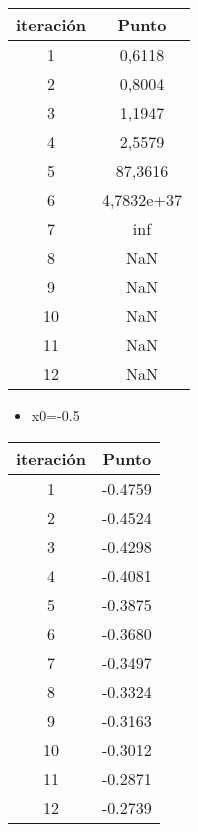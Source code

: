 \documentclass{udparticle}
\begin{document}
\begin{enumerate}
\begin{enumerate}
\begin{table}[H]
\begin{tabular} { |c|c|}
        \hline
        iteración  &  Punto\\
        \hline
        1 &  0,6118        \\
         \hline
        2 &  0,8004        \\
         \hline
        3 &  1,1947        \\
         \hline
        4 &  2,5579        \\
         \hline
        5 &  87,3616        \\
         \hline
        6 & 4,7832e+37        \\
         \hline
        7 & inf           \\
         \hline
        8 &  NaN        \\
         \hline
        9 &  NaN        \\
         \hline
        10 &  NaN        \\
         \hline
        11 &  NaN        \\
         \hline
        12 &  NaN        \\
        
        
        \end{tabular}
    \end{table}
 
 \begin{itemize}
\item x0=-0.5
\end{itemize}
\begin{table}[H]
    \centering
        \begin{tabular} { |c|c|}
        
        \hline
        iteración  &  Punto\\
        \hline
        1 &  -0.4759        \\
         \hline
        2 &  -0.4524        \\
         \hline
        3 &  -0.4298        \\
         \hline
        4 &   -0.4081      \\
         \hline
        5 &  -0.3875        \\
         \hline
        6 &  -0.3680       \\
         \hline
        7 &  -0.3497        \\
         \hline
        8 &  -0.3324        \\
         \hline
        9 &  -0.3163        \\
         \hline
        10 &  -0.3012       \\
         \hline
        11 &  -0.2871       \\
         \hline
        12 &  -0.2739        \\
        \end{tabular}
\end{table}


\end{enumerate}
\end{enumerate}
\end{document}
